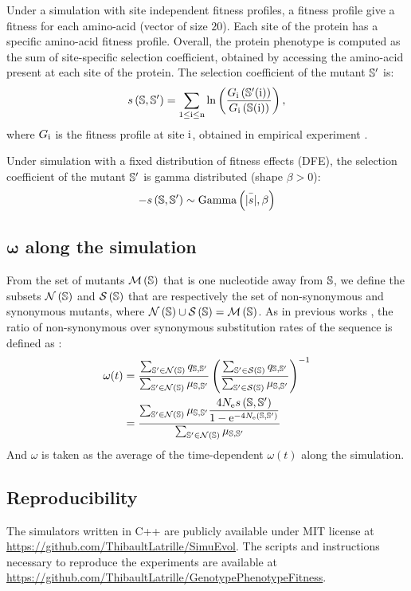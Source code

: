 \documentclass{article}
\begin{document}
	Under a simulation with site independent fitness profiles, a fitness profile give a fitness for each amino-acid (vector of size $20$).
	Each site of the protein has a specific amino-acid fitness profile.
	Overall, the protein phenotype is computed as the sum of site-specific selection coefficient, obtained by accessing the amino-acid present at each site of the protein.
	The selection coefficient of the mutant $\mathbb{S}'$ is:
	\begin{equation}
	s \left( \mathbb{S},\mathbb{S}'\right) = \sum_{1 \leq \text{i} \leq \text{n}} \ln \left( \dfrac{G_{\text{i}} \left(\mathbb{S}'(\text{i}) \right)}{G_{\text{i}} \left(\mathbb{S}(\text{i}) \right)} \right) ,
	\end{equation}
	where $G_{\text{i}}$ is the fitness profile at site $\text{i}$, obtained in empirical experiment \cite{Bloom2017}.
	
	
	Under simulation with a fixed distribution of fitness effects (DFE), the selection coefficient of the mutant $\mathbb{S}'$ is gamma distributed (shape $\beta > 0$):
	\begin{equation}
	- s \left( \mathbb{S},\mathbb{S}'\right) \sim \text{Gamma} \left( \bar{|s|}, \beta \right)
	\end{equation}
	\subsection*{$\bm{\omega}$ along the simulation}
	From the set of mutants $\mathcal{M}\left(\mathbb{S}\right)$ that is one nucleotide away from $\mathbb{S}$, we define the subsets $\mathcal{N}\left(\mathbb{S}\right)$ and $\mathcal{S}\left(\mathbb{S}\right)$ that are respectively the set of non-synonymous and synonymous mutants, where $\mathcal{N}\left(\mathbb{S}\right) \cup \mathcal{S}\left(\mathbb{S}\right) = \mathcal{M}\left(\mathbb{S}\right)$.
	As in previous works \cite{Spielman2015a, DosReis2015, Jones2016}, the ratio of non-synonymous over synonymous substitution rates of the sequence is defined as :
	\begin{align}
	\omega(t) &= \dfrac{\sum_{\mathbb{S}' \in \mathcal{N}\left(\mathbb{S}\right)} q_{\mathbb{S}, \mathbb{S}'}}{\sum_{\mathbb{S}' \in \mathcal{N}\left(\mathbb{S}\right)} \mu_{\mathbb{S}, \mathbb{S}'}} \left( \dfrac{\sum_{\mathbb{S}' \in \mathcal{S}\left(\mathbb{S}\right)} q_{\mathbb{S}, \mathbb{S}'}}{\sum_{\mathbb{S}' \in \mathcal{S}\left(\mathbb{S}\right)} \mu_{\mathbb{S}, \mathbb{S}'}} \right)^{-1}\\
	&= \dfrac{\sum_{\mathbb{S}' \in \mathcal{N}\left(\mathbb{S}\right)} \mu_{\mathbb{S}, \mathbb{S}'} \dfrac{4 N_{\mathrm{e}} s \left( \mathbb{S},\mathbb{S}'\right)}{{1 - \mathrm{e}^{-4 N_{\mathrm{e}} \left( \mathbb{S},\mathbb{S}'\right)} }}}{\sum_{\mathbb{S}' \in \mathcal{N}\left(\mathbb{S}\right)} \mu_{\mathbb{S}, \mathbb{S}'}} 
	\end{align}
	And $\omega$ is taken as the average of the time-dependent $\omega(t)$ along the simulation.
	\subsection*{Reproducibility}
	The simulators written in C++ are publicly available under MIT license at \url{https://github.com/ThibaultLatrille/SimuEvol}.
	The scripts and instructions necessary to reproduce the experiments are available at \url{https://github.com/ThibaultLatrille/GenotypePhenotypeFitness}.
	
	
	
\end{document}
